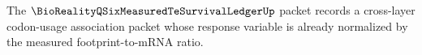 \label{ch:concrete-instances-bioreality-q-six-measured-te-survival-ledger-namecert}

The $\BioRealityQSixMeasuredTeSurvivalLedgerUp$ packet records a cross-layer codon-usage association packet whose response variable is already normalized by the measured footprint-to-mRNA ratio.
